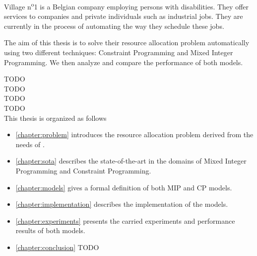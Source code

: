 \documentclass[../thesis.tex]{subfiles}
\begin{document}
Village n\textsuperscript{o}1 is a Belgian company employing persons with disabilities.
They offer services to companies and private individuals such as industrial jobs.
They are currently in the process of automating the way they schedule these jobs. 


The aim of this thesis is to solve their resource allocation problem
automatically using two different techniques: Constraint Programming and Mixed Integer Programming.
We then analyze and compare the performance of both models.


TODO \\ 
TODO\\ 
TODO\\ 
TODO\\



This thesis is organized as follows

\begin{itemize}
  \item[] \autoref{chapter:problem} introduces the resource allocation problem derived from the needs of \vone.
  \item[] \autoref{chapter:sota} describes the state-of-the-art in the domains of Mixed Integer Programming and Constraint Programming. 
  \item[] \autoref{chapter:models} gives a formal definition of both MIP and CP models.
  \item[] \autoref{chapter:implementation} describes the implementation of the models.
  \item[] \autoref{chapter:experiments} presents the carried experiments and performance results of both models.
  \item[] \autoref{chapter:conclusion} TODO  
\end{itemize}
\end{document}

